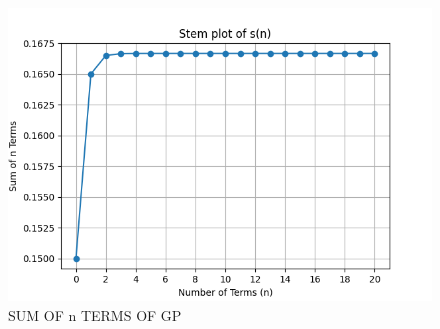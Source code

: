 \documentclass[journal,12pt,twocolumn]{IEEEtran}
\theoremstyle{remark}
\begin{document}
 
\newpage

\begin{figure}[h]
  \centering
  \includegraphics[width=1.0\textwidth]{figs/graph.png}
  \caption{SUM OF n TERMS OF GP}
  \label{fig:your_label}
\end{figure}
\end{document}
